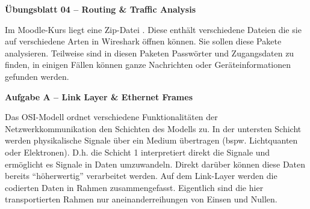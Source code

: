 \documentclass[paper=a4,fontsize=11pt]{scrartcl}%
\begin{document}
\begin{center}
\Large{\textbf{Übungsblatt 04 -- Routing \& Traffic Analysis}}\\
\end{center}

Im Moodle-Kurs liegt eine Zip-Datei . Diese enthält verschiedene Dateien die sie auf verschiedene Arten in Wireshark öffnen können. Sie sollen diese Pakete analysieren. Teilweise sind in diesen Paketen Passwörter und Zugangsdaten zu finden, in einigen Fällen können ganze Nachrichten oder Geräteinformationen gefunden werden.

\begin{center}\Large{\textbf{Aufgabe A -- Link Layer \& Ethernet Frames}}\end{center}\vskip0.2in
Das OSI-Modell ordnet verschiedene Funktionalitäten der Netzwerkkommunikation den Schichten des Modells zu. In der untersten Schicht werden physikalische Signale über ein Medium übertragen (bspw. Lichtquanten oder Elektronen). D.h. die Schicht 1 interpretiert direkt die Signale und ermöglicht es Signale in Daten umzuwandeln. Direkt darüber können diese Daten bereits \enquote{höherwertig} verarbeitet werden. Auf dem Link-Layer werden die codierten Daten in Rahmen zusammengefasst. Eigentlich sind die hier transportierten Rahmen nur aneinanderreihungen von Einsen und Nullen.
\end{document}
